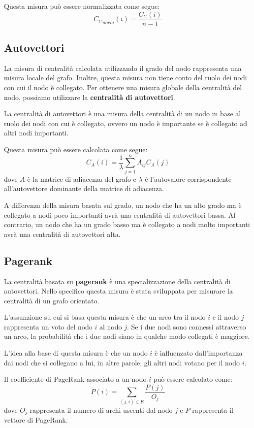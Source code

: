 Questa misura può essere normalizzata come segue:
\begin{equation}
    {C_C}_{norm}(i) = \frac{C_C(i)}{n - 1}
\end{equation}
\subsection{Autovettori}
La misura di centralità calcolata utilizzando il grado del nodo rappresenta una
misura locale del grafo. Inoltre, questa misura non tiene conto del ruolo dei
nodi con cui il nodo è collegato. Per ottenere una misura globale della
centralità del nodo, possiamo utilizzare la \textbf{centralità di autovettori}.

La centralità di autovettori è una misura della centralità di un nodo in base
al ruolo dei nodi con cui è collegato, ovvero un nodo è importante se è
collegato ad altri nodi importanti.

Questa misura può essere calcolata come segue:
\begin{equation}
    C_A(i) = \frac{1}{\lambda} \sum_{j=1}^{n} A_{ij} C_A(j)
\end{equation}
dove $A$ è la matrice di adiacenza del grafo e $\lambda$ è l'autovalore
corrispondente all'autovettore dominante della matrice di adiacenza.

A differenza della misura basata sul grado, un nodo che ha un alto grado ma è
collegato a nodi poco importanti avrà una centralità di autovettori bassa. Al
contrario, un nodo che ha un grado basso ma è collegato a nodi molto importanti
avrà una centralità di autovettori alta.
\subsection{Pagerank}
La centralità basata su \textbf{pagerank} è una specializzazione della centralità
di autovettori. Nello specifico questa misura è stata sviluppata per misurare
la centralità di un grafo orientato.

L'assunzione su cui si basa questa misura è che un arco tra il nodo $i$ e il
nodo $j$ rappresenta un voto del nodo $i$ al nodo $j$. Se i due nodi sono connessi
attraverso un arco, la probabilità che i due nodi siano in qualche modo collegati
è maggiore.

L'idea alla base di questa misura è che un nodo $i$ è influenzato dall'importanza
dai nodi che si collegano a lui, in altre parole, gli altri nodi votano per il
nodo $i$.

Il coefficiente di PageRank associato a un nodo $i$ può essere calcolato come:
\begin{equation}
    P(i) = \sum_{(j, i) \in E} \frac{P(j)}{O_j}
\end{equation}
dove $O_j$ rappresenta il numero di archi uscenti dal nodo $j$ e $P$ rappresenta
il vettore di PageRank.


